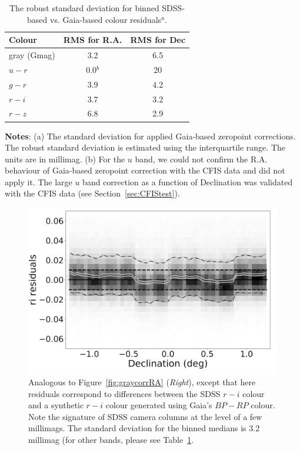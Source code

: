 \documentclass[fleqn,usenatbib]{mnras}
\begin{document}
\begin{table}
	\centering
	\caption{The robust standard deviation for binned SDSS-based vs. Gaia-based colour residuals$^a$. }
	\label{tab:GaiaRMS}

	\begin{tabular}{l|c|c} %
		\hline
		Colour & RMS for R.A. & RMS for Dec \\
		\hline
 
 gray (Gmag) &    3.2         &    6.5   \\
    $u-r$        &   0.0$^b$  &   20    \\     
    $g-r$        &   3.9         &    4.2    \\
    $r-i$         &   3.7         &    3.2    \\ 
    $r-z$        &   6.8         &    2.9    \\ 
		\hline
	\end{tabular}
     \vspace{1ex}

     {\raggedright {\bf Notes}: (a) The standard deviation for applied Gaia-based zeropoint corrections. The robust standard deviation is estimated using the interquartile range. The units are in millimag. \newline (b) For the $u$ band, we could not confirm the R.A. behaviour of Gaia-based zeropoint correction with the CFIS data and did not apply it. The large $u$ band correction as a function of Declination was validated with the CFIS data (see Section~\ref{sec:CFIStest}). \par}
\end{table}

 

\begin{figure}
    \centering\includegraphics[width=0.9\columnwidth]{figures/colorResidGaiaColorsB_ri_Dec_Hess_lr.png} 
\caption{Analogous to Figure~\ref{fig:graycorrRA} ({\it Right}), except that here residuals 
correspond to differences between the SDSS $r-i$ colour and a synthetic $r-i$ colour
generated using Gaia's $BP-RP$ colour. Note the signature of SDSS camera columns
at the level of a few millimags. The standard deviation for the binned medians is 
3.2 millimag (for other bands, please see Table~\ref{tab:GaiaRMS}.}
\label{fig:riresid}
\end{figure}
\end{document}
